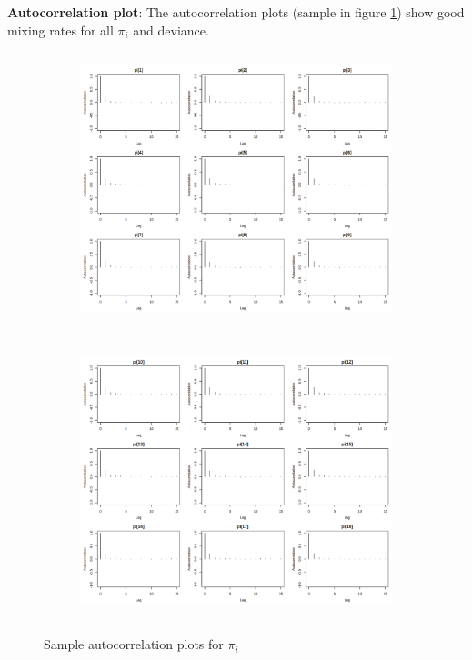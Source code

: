 \documentclass[12pt]{article}
\begin{document}
\textbf{Autocorrelation plot}: The autocorrelation plots (sample in figure \ref{fig:autocorrM1}) show good mixing rates for all $\pi_i$ and deviance.

\begin{figure}[h!]
    \centering
    \begin{subfigure}{0.45\textwidth}
        \includegraphics[width=\linewidth, height=8cm]{pictures/autocorr1.png}
    \end{subfigure}
    \begin{subfigure}{0.45\textwidth}
        \includegraphics[width=\linewidth, height=8cm]{pictures/autocorr2.png}
    \end{subfigure}
    \caption{Sample autocorrelation plots for $\pi_i$}
    \label{fig:autocorrM1}
\end{figure}
\FloatBarrier %
\end{document}
